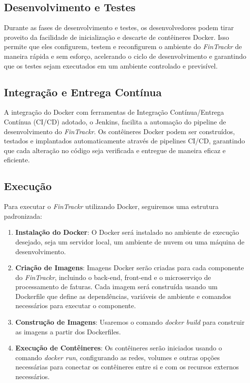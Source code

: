 \subsection{Desenvolvimento e Testes}

Durante as fases de desenvolvimento e testes, os desenvolvedores podem tirar proveito da facilidade de inicialização e descarte de contêineres Docker. Isso permite que eles configurem, testem e reconfigurem o ambiente do \textit{FinTrackr} de maneira rápida e sem esforço, acelerando o ciclo de desenvolvimento e garantindo que os testes sejam executados em um ambiente controlado e previsível.

\subsection{Integração e Entrega Contínua}

A integração do Docker com ferramentas de Integração Contínua/Entrega Contínua (CI/CD) adotado, o Jenkins, facilita a automação do pipeline de desenvolvimento do \textit{FinTrackr}. Os contêineres Docker podem ser construídos, testados e implantados automaticamente através de pipelines CI/CD, garantindo que cada alteração no código seja verificada e entregue de maneira eficaz e eficiente.

\subsection{Execução}

Para executar o \textit{FinTrackr} utilizando Docker, seguiremos uma estrutura padronizada:

\begin{enumerate}
	\item \textbf{Instalação do Docker}: O Docker será instalado no ambiente de execução desejado, seja um servidor local, um ambiente de nuvem ou uma máquina de desenvolvimento.
	\item \textbf{Criação de Imagens}: Imagens Docker serão criadas para cada componente do \textit{FinTrackr}, incluindo o back-end, front-end e o microserviço de processamento de faturas. Cada imagem será construída usando um Dockerfile que define as dependências, variáveis de ambiente e comandos necessários para executar o componente.
	\item \textbf{Construção de Imagens}: Usaremos o comando \textit{docker build} para construir as imagens a partir dos Dockerfiles.
	\item \textbf{Execução de Contêineres}: Os contêineres serão iniciados usando o comando \textit{docker run}, configurando as redes, volumes e outras opções necessárias para conectar os contêineres entre si e com os recursos externos necessários.
\end{enumerate}

